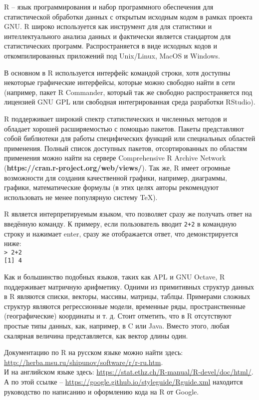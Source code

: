 
    R – язык программирования и набор программного обеспечения для статистической обработки 
    данных с открытым исходным кодом в рамках проекта GNU. R широко используется как 
    инструмент для для статистики и интеллектуального анализа данных и фактически является стандартом
    для статистических программ. Распространяется в виде исходных кодов и откомпилированных
    приложений под Unix/Linux, MacOS и Windows. 
    
    \indent В основном в R используется интерфейс командой строки, хотя доступны некоторые графические
    интерфейсы, которые можно свободно найти в сети (например, пакет R Commander, который так
    же свободно распространяется под лицензией GNU GPL или свободная интегрированная среда
    разработки RStudio).  
    
    \indent R поддерживает широкий спектр статистических и численных методов и обладает хорошей расширяемостью 
    с помощью пакетов. Пакеты представляют собой библиотеки для работы специфических функций или 
    специальных областей применения. Полный список доступных пакетов, отсортированных по областям 
    применения можно найти на сервере Comprehensive R Archive Network (\textbf{https://cran.r-project.org/web/views/}). Так же, R имеет огромные 
    возможности для создания качественной графики, например, диаграммы, графики, математические формулы 
    (в этих целях авторы рекомендуют использовать не менее популярную систему TeX). 
    
    \indent R является интерпретируемым языком, что позволяет сразу же получать ответ на введённую
    команду. К примеру, если пользователь вводит \texttt{2+2} в командную строку и нажимает enter, сразу же
    отображается ответ, что демонстрируется ниже: \\
    \indent \texttt{> 2+2} \\ 
    \indent \texttt{[1] 4} 
    
    \indent Как и большинство подобных языков, таких как APL и GNU Octave, R поддерживает матричную арифметику.
    Одними из примитивных структур данных в R являются списки, векторы, массивы, матрицы, таблцы.
    Примерами сложных структур являются регрессионные модели, временные ряды, пространственные 
    (географические) координаты и т. д. Стоит отметить, что в R отсутствуют простые типы данных, как,
    например, в C или Java. Вместо этого, любая скалярная величина представляется, как вектор длины один.  
    
    \indent Документацию по R на русском языке можно найти здесь: \url{http://herba.msu.ru/shipunov/software/r/r-ru.htm}. \\
    \indent И на английском языке здесь: \url{https://stat.ethz.ch/R-manual/R-devel/doc/html/}.
    \indent А по этой ссылке -- \url{https://google.github.io/styleguide/Rguide.xml} находится
    руководство по написанию и оформлению кода на R от Google.
